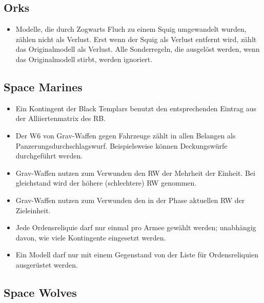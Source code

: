 \subsection{Orks}

\begin{itemize}

 \item Modelle, die durch Zogwarts Fluch zu einem Squig umgewandelt wurden,
  zählen nicht als Verlust. Erst wenn der Squig als Verlust entfernt wird, zählt
  das Originalmodell als Verlust.  Alle Sonderregeln, die ausgelöst werden, wenn
  das Originalmodell stirbt, werden ignoriert.

\end{itemize}

\subsection{Space Marines}

\begin{itemize}

 \item Ein Kontingent der Black Templars benutzt den entsprechenden Eintrag aus
  der Alliiertenmatrix des RB.

 \item Der W6 von Grav-Waffen gegen Fahrzeuge zählt in allen Belangen als
  Panzerungsdurchschlagswurf. Beispielsweise können Deckungswürfe durchgeführt
  werden.

 \item Grav-Waffen nutzen zum Verwunden den RW der Mehrheit der Einheit. Bei
  gleichstand wird der höhere (schlechtere) RW genommen.

 \item Grav-Waffen nutzen zum Verwunden den in der Phase aktuellen RW der
  Zieleinheit.

 \item Jede Ordensreliquie darf nur einmal pro Armee gewählt werden; unabhängig
  davon, wie viele Kontingente eingesetzt werden.

 \item Ein Modell darf nur mit einem Gegenstand von der Liste für
  Ordensreliquien ausgerüstet werden.

\end{itemize}

\subsection{Space Wolves}


